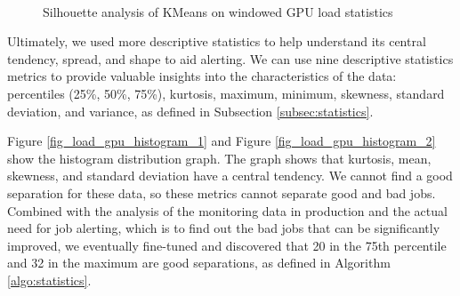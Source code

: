 \begin{figure}[H]
{    }\\
    \caption{Silhouette analysis of KMeans on windowed GPU load statistics}
    \label{fig_silhouette_statistics}
\end{figure}

Ultimately, we used more descriptive statistics to help understand its central tendency, spread, and shape to aid alerting. We can use nine descriptive statistics metrics to provide valuable insights into the characteristics of the data: percentiles (25\%, 50\%, 75\%), kurtosis, maximum, minimum, skewness, standard deviation, and variance, as defined in Subsection \ref{subsec:statistics}.

Figure \ref{fig_load_gpu_histogram_1} and Figure \ref{fig_load_gpu_histogram_2} show the histogram distribution graph. The graph shows that kurtosis, mean, skewness, and standard deviation have a central tendency. We cannot find a good separation for these data, so these metrics cannot separate good and bad jobs. Combined with the analysis of the monitoring data in production and the actual need for job alerting, which is to find out the bad jobs that can be significantly improved, we eventually fine-tuned and discovered that 20 in the 75th percentile and 32 in the maximum are good separations, as defined in Algorithm \ref{algo:statistics}.

